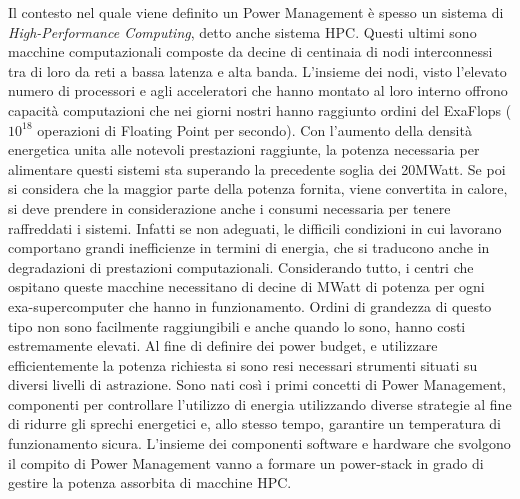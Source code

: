 Il contesto nel quale viene definito un Power Management è spesso un sistema di \emph{High-Performance Computing}, detto anche sistema HPC. Questi ultimi sono macchine computazionali composte da decine di centinaia di nodi interconnessi tra di loro da reti a bassa latenza e alta banda. L'insieme dei nodi, visto l'elevato numero di processori e agli acceleratori che hanno montato al loro interno offrono capacità computazioni che nei giorni nostri hanno raggiunto ordini del ExaFlops ($10^{18}$ operazioni di  Floating Point per secondo).
Con l'aumento della densità energetica unita alle notevoli prestazioni raggiunte, la potenza necessaria per alimentare questi sistemi sta superando la precedente soglia dei 20MWatt. Se poi si considera che la maggior parte della potenza fornita, viene convertita in calore, si deve prendere in considerazione anche i consumi necessaria per tenere raffreddati i sistemi. Infatti se non adeguati, le difficili condizioni in cui lavorano comportano grandi inefficienze in termini di energia, che si traducono anche in degradazioni di prestazioni computazionali. 
Considerando tutto, i centri che ospitano queste macchine necessitano di decine di MWatt di potenza per ogni exa-supercomputer che hanno in funzionamento. 
Ordini di grandezza di questo tipo non sono facilmente raggiungibili e anche quando lo sono, hanno costi estremamente elevati. 
Al fine di definire dei power budget, e utilizzare efficientemente la potenza richiesta si sono resi necessari strumenti situati su diversi livelli di astrazione. 
Sono nati così i primi concetti di Power Management, componenti per controllare l'utilizzo di energia utilizzando diverse strategie al fine di ridurre gli sprechi energetici e, allo stesso tempo, garantire un temperatura di funzionamento sicura.%
L'insieme dei componenti software e hardware che svolgono il compito di Power Management vanno a formare un power-stack in grado di gestire la potenza assorbita di macchine HPC.

